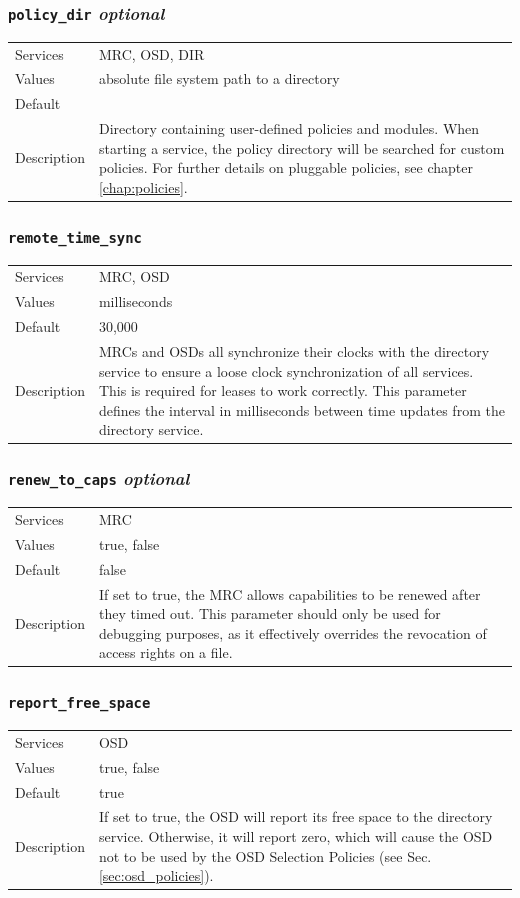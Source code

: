 \documentclass[a4paper,10pt]{book}
\begin{document}
\subsubsection{\texttt{policy\_dir} \textit{optional}}
\begin{tabular}{lp{10cm}}
 Services & MRC, OSD, DIR\\
 Values   & absolute file system path to a directory\\
 Default  & \\
 Description & Directory containing user-defined policies and modules. When starting a service, the policy directory will be searched for custom policies. For further details on pluggable policies, see chapter \ref{chap:policies}.
\end{tabular}

\subsubsection{\texttt{remote\_time\_sync}}
\begin{tabular}{lp{10cm}}
 Services & MRC, OSD\\
 Values   & milliseconds \\
 Default  & 30,000\\
 Description & MRCs and OSDs all synchronize their clocks with the directory service to ensure a loose clock synchronization of all services. This is required for leases to work correctly. This parameter defines the interval in milliseconds between time updates from the directory service.
\end{tabular}

\subsubsection{\texttt{renew\_to\_caps} \textit{optional}}
\begin{tabular}{lp{10cm}}
 Services & MRC\\
 Values   & true, false\\
 Default  & false\\
 Description & If set to true, the MRC allows capabilities to be renewed after they timed out. This parameter should only be used for debugging purposes, as it effectively overrides the revocation of access rights on a file.
\end{tabular}

\subsubsection{\texttt{report\_free\_space}}
\begin{tabular}{lp{10cm}}
 Services & OSD\\
 Values   & true, false\\
 Default  & true\\
 Description & If set to true, the OSD will report its free space to the directory service. Otherwise, it will report zero, which will cause the OSD not to be used by the OSD Selection Policies (see Sec. \ref{sec:osd_policies}).
\end{tabular}
\end{document}
